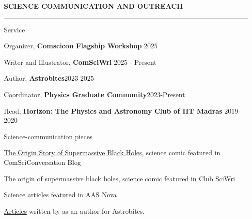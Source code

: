 \documentclass{resume} %
\renewenvironment{rSection}[1]{
\sectionskip
\textbf{\textcolor{C2}{\MakeUppercase{#1}}}
\sectionlineskip
\hrule
\begin{list}{}{
\setlength{\leftmargin}{1.5em}
}
\item[]
}{
\end{list}
}
\begin{document}
\begin{rSection}{Science communication and outreach}
    \begin{rSubsection}{Service}{}{}{}
    \item Organizer, {\color{C3} \textbf{Comscicon Flagship Workshop}} \hfill 2025
    \item Writer and Illustrator, {\color{C3} \textbf{ComSciWri}} \hfill 2025 - Present
    \item Author, {\color{C3} \textbf{Astrobites}}\hfill 2023-2025
    \item Coordinator, {\color{C3} \textbf{Physics Graduate Community}}\hfill 2023-Present
    \item Head, {\color{C3} \textbf{Horizon: The Physics and Astronomy Club of IIT Madras}} \hfill 2019-2020
    \end{rSubsection}

    \begin{rSubsection}{Science-communication pieces}{}{}{}
    \item \href{https://www.comscicon.org/news/origin-story-supermassive-black-holes}{The Origin Story of Supermassive Black Holes}, science comic featured in \\
    ComSciConversation Blog
    \item \href{https://sciwri.club/archives/13482}{The origin of supermassive black holes}, science comic featured in Club SciWri
    \item Science articles featured in \href{https://aasnova.org/?s=Pranav+Satheesh+}{AAS Nova}
    \item \href{https://astrobites.org/author/psatheesh/}{Articles} written by as an author for Astrobites. 

    \end{rSubsection}


\end{rSection}
\end{document}
